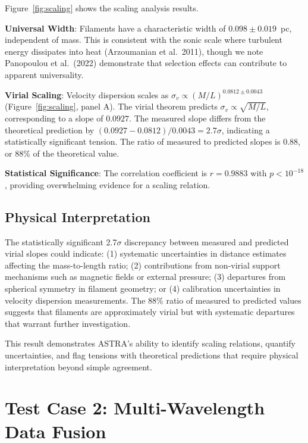 \documentclass[usenatbib]{rasti}
\begin{document}
Figure~\ref{fig:scaling} shows the scaling analysis results.

\textbf{Universal Width}: Filaments have a characteristic width of $0.098 \pm 0.019$~pc, independent of mass. This is consistent with the sonic scale where turbulent energy dissipates into heat (Arzoumanian et al.~2011)\cite{arzoumanian2011}, though we note Panopoulou et al.~(2022)\cite{panopoulou2022} demonstrate that selection effects can contribute to apparent universality.

\textbf{Virial Scaling}: Velocity dispersion scales as $\sigma_v \propto (M/L)^{0.0812 \pm 0.0043}$ (Figure~\ref{fig:scaling}, panel A). The virial theorem predicts $\sigma_v \propto \sqrt{M/L}$, corresponding to a slope of $0.0927$. The measured slope differs from the theoretical prediction by $(0.0927 - 0.0812)/0.0043 = 2.7\sigma$, indicating a statistically significant tension. The ratio of measured to predicted slopes is $0.88$, or 88\% of the theoretical value.

\textbf{Statistical Significance}: The correlation coefficient is $r = 0.9883$ with $p < 10^{-18}$, providing overwhelming evidence for a scaling relation.

\subsection{Physical Interpretation}

The statistically significant 2.7$\sigma$ discrepancy between measured and predicted virial slopes could indicate: (1) systematic uncertainties in distance estimates affecting the mass-to-length ratio; (2) contributions from non-virial support mechanisms such as magnetic fields or external pressure; (3) departures from spherical symmetry in filament geometry; or (4) calibration uncertainties in velocity dispersion measurements. The 88\% ratio of measured to predicted values suggests that filaments are approximately virial but with systematic departures that warrant further investigation.

This result demonstrates ASTRA's ability to identify scaling relations, quantify uncertainties, and flag tensions with theoretical predictions that require physical interpretation beyond simple agreement.

\section{Test Case 2: Multi-Wavelength Data Fusion}
\end{document}
